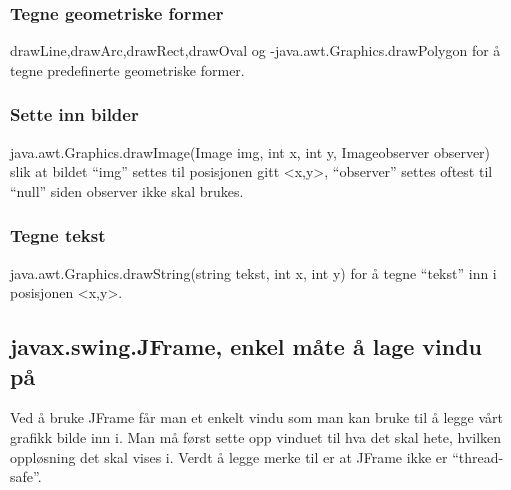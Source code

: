 \documentclass[norsk]{article}
\begin{document}
\subsubsection{Tegne geometriske former}
drawLine,drawArc,drawRect,drawOval og -java.awt.Graphics.drawPolygon
for å tegne predefinerte geometriske former.

\subsubsection{Sette inn bilder}
java.awt.Graphics.drawImage(Image img, int x, int y, Imageobserver observer)
slik at bildet ``img'' settes til posisjonen gitt <x,y>, ``observer'' settes
oftest til ``null'' siden observer ikke skal brukes.

\subsubsection{Tegne tekst}
java.awt.Graphics.drawString(string tekst, int x, int y) for å tegne
``tekst'' inn i posisjonen <x,y>.

\subsection{javax.swing.JFrame, enkel måte å lage vindu på}
Ved å bruke JFrame får man et enkelt vindu som man kan bruke til å 
legge vårt grafikk bilde inn i. Man må først sette opp vinduet til hva det
skal hete, hvilken oppløsning det skal vises i.
Verdt å legge merke til er at JFrame ikke er ``thread-safe''.
\end{document}
